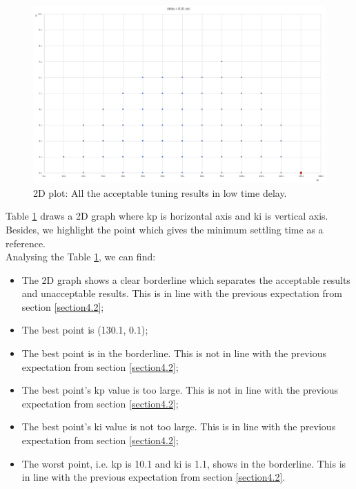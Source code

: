 \documentclass{report}
\begin{document}
\begin{figure}[htbp]
\centering
\includegraphics[width = .819\textwidth]{figure/4_4_1_2d.png}
\caption{2D plot: All the acceptable tuning results in low time delay.}
\label{4_4_1_2d}
\end{figure}

Table \textcolor{red}{\ref{4_4_1_2d}} draws a 2D graph where kp is horizontal axis and ki is vertical axis. Besides, we highlight the point which gives the minimum settling time as a reference.\\

Analysing the Table \textcolor{red}{\ref{4_4_1_2d}}, we can find:\\

\begin{itemize}
\item The 2D graph shows a clear borderline which separates the acceptable results and unacceptable results. This is in line with the previous expectation from section \textcolor{red}{\ref{section4.2}};\\

\item The best point is (130.1, 0.1);\\

\item The best point is in the borderline.  This is not in line with the previous expectation from section \textcolor{red}{\ref{section4.2}};\\

\item The best point’s kp value is too large. This is not in line with the previous expectation from section \textcolor{red}{\ref{section4.2}};\\

\item The best point's ki value is not too large.  This is in line with the previous expectation from section \textcolor{red}{\ref{section4.2}};\\

\item The worst point, i.e. kp is 10.1 and ki is 1.1, shows in the borderline. This is in line with the previous expectation from section \textcolor{red}{\ref{section4.2}}.\\
\end{itemize}
\end{document}
